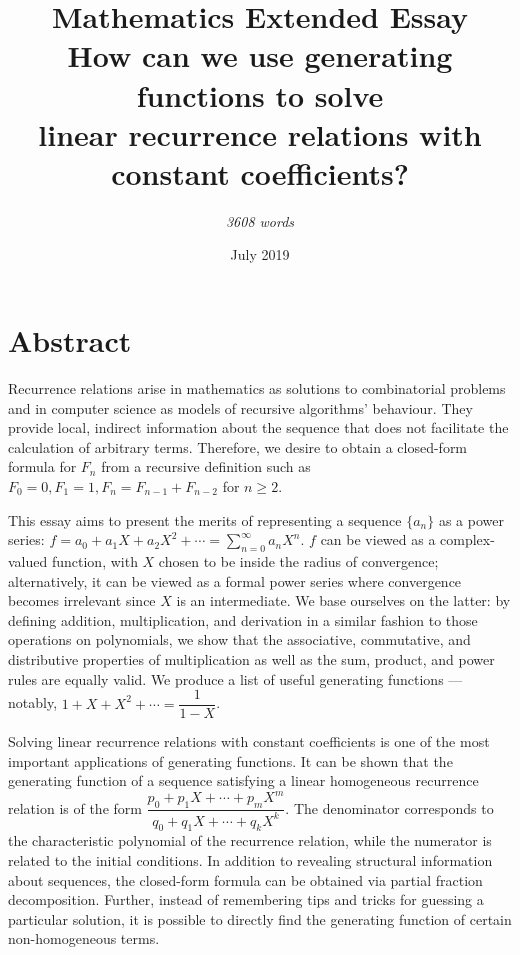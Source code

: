 \documentclass[a4paper, 12pt]{report}
\title{
    { \textbf{Mathematics Extended Essay}}\\
    \bigskip
    {\Large How can we use generating functions to solve\\  linear recurrence relations with constant coefficients?}
}
\author{\textit{3608 words}}
\date{July 2019}
\begin{document}
\allowdisplaybreaks
\thispagestyle{empty}
\maketitle


\chapter*{Abstract}
\thispagestyle{empty}
Recurrence relations arise in mathematics as solutions to combinatorial problems and in computer science as models of recursive algorithms' behaviour. They provide local, indirect information about the sequence that does not facilitate the calculation of arbitrary terms. Therefore, we desire to obtain a closed-form formula for $F_n$ from a recursive definition such as $F_0 = 0, F_1 = 1, F_n = F_{n - 1} + F_{n - 2}$ for $n \geq 2$.

This essay aims to present the merits of representing a sequence $\{a_n\}$ as a power series: $f = a_0 + a_1 X + a_2 X^2 + \cdots = \sum_{n = 0}^\infty a_n X^n$. $f$ can be viewed as a complex-valued function, with $X$ chosen to be inside the radius of convergence; alternatively, it can be viewed as a formal power series where convergence becomes irrelevant since $X$ is an intermediate. We base ourselves on the latter: by defining addition, multiplication, and derivation in a similar fashion to those operations on polynomials, we show that the associative, commutative, and distributive properties of multiplication as well as the sum, product, and power rules are equally valid. We produce a list of useful generating functions --- notably, $1 + X + X^2 + \cdots = \dfrac{1}{1 - X}$.

Solving linear recurrence relations with constant coefficients is one of the most important applications of generating functions. It can be shown that the generating function of a sequence satisfying a linear homogeneous recurrence relation is of the form $\dfrac{p_0 + p_1 X + \cdots + p_m X^m}{q_0 + q_1 X + \cdots + q_k X^k}$. The denominator corresponds to the characteristic polynomial of the recurrence relation, while the numerator is related to the initial conditions. In addition to revealing structural information about sequences, the closed-form formula can be obtained via partial fraction decomposition. Further, instead of remembering tips and tricks for guessing a particular solution, it is possible to directly find the generating function of certain non-homogeneous terms.
\end{document}
